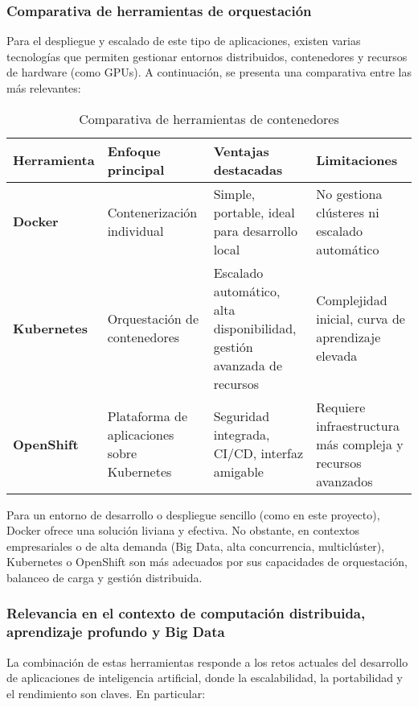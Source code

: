 \documentclass{article}
\begin{document}
\subsubsection*{Comparativa de herramientas de orquestación}

Para el despliegue y escalado de este tipo de aplicaciones, existen varias tecnologías que permiten gestionar entornos distribuidos, contenedores y recursos de hardware (como GPUs). A continuación, se presenta una comparativa entre las más relevantes:

\begin{table}[!ht]
    \centering
    \renewcommand{\arraystretch}{1.2} %
    \begin{tabularx}{\textwidth}{|l|X|X|X|}
        \hline
        \textbf{Herramienta} & \textbf{Enfoque principal} & \textbf{Ventajas destacadas} & \textbf{Limitaciones} \\ \hline
        \textbf{Docker} & Contenerización individual & Simple, portable, ideal para desarrollo local & No gestiona clústeres ni escalado automático \\ \hline
        \textbf{Kubernetes} & Orquestación de contenedores & Escalado automático, alta disponibilidad, gestión avanzada de recursos & Complejidad inicial, curva de aprendizaje elevada \cite{kubernetes2023} \\ \hline
        \textbf{OpenShift} & Plataforma de aplicaciones sobre Kubernetes & Seguridad integrada, CI/CD, interfaz amigable & Requiere infraestructura más compleja y recursos avanzados \cite{openshift2023} \\ \hline
    \end{tabularx}
    \caption{Comparativa de herramientas de contenedores}
\end{table}

Para un entorno de desarrollo o despliegue sencillo (como en este proyecto), Docker ofrece una solución liviana y efectiva. No obstante, en contextos empresariales o de alta demanda (Big Data, alta concurrencia, multiclúster), Kubernetes o OpenShift son más adecuados por sus capacidades de orquestación, balanceo de carga y gestión distribuida.

\subsubsection*{Relevancia en el contexto de computación distribuida, aprendizaje profundo y Big Data}

La combinación de estas herramientas responde a los retos actuales del desarrollo de aplicaciones de inteligencia artificial, donde la escalabilidad, la portabilidad y el rendimiento son claves. En particular:
\end{document}
